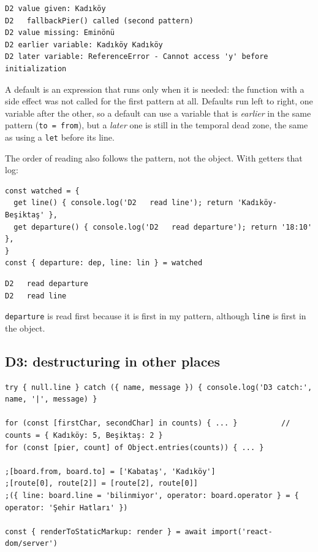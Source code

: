 \documentclass[
  10pt,
]{article}
\begin{document}
\begin{verbatim}
D2 value given: Kadıköy
D2   fallbackPier() called (second pattern)
D2 value missing: Eminönü
D2 earlier variable: Kadıköy Kadıköy
D2 later variable: ReferenceError - Cannot access 'y' before initialization
\end{verbatim}

A default is an expression that runs only when it is needed: the
function with a side effect was not called for the first pattern at all.
Defaults run left to right, one variable after the other, so a default
can use a variable that is \emph{earlier} in the same pattern
(\texttt{to =\allowbreak{} from}), but a \emph{later} one is still in
the temporal dead zone, the same as using a \texttt{let} before its
line.

The order of reading also follows the pattern, not the object. With
getters that log:

\begin{verbatim}
const watched = {
  get line() { console.log('D2   read line'); return 'Kadıköy-Beşiktaş' },
  get departure() { console.log('D2   read departure'); return '18:10' },
}
const { departure: dep, line: lin } = watched
\end{verbatim}

\begin{verbatim}
D2   read departure
D2   read line
\end{verbatim}

\texttt{departure} is read first because it is first in my pattern,
although \texttt{line} is first in the object.

\hypertarget{d3-destructuring-in-other-places}{%
\subsection{D3: destructuring in other
places}\label{d3-destructuring-in-other-places}}

\begin{verbatim}
try { null.line } catch ({ name, message }) { console.log('D3 catch:', name, '|', message) }

for (const [firstChar, secondChar] in counts) { ... }          // counts = { Kadıköy: 5, Beşiktaş: 2 }
for (const [pier, count] of Object.entries(counts)) { ... }

;[board.from, board.to] = ['Kabataş', 'Kadıköy']
;[route[0], route[2]] = [route[2], route[0]]
;({ line: board.line = 'bilinmiyor', operator: board.operator } = { operator: 'Şehir Hatları' })

const { renderToStaticMarkup: render } = await import('react-dom/server')
\end{verbatim}
\end{document}
